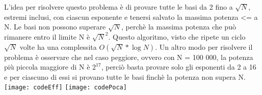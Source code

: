 
\SolRadLog
L'idea per risolvere questo problema è di provare tutte le basi da 2 fino a $\sqrt{N}$, estremi inclusi, con ciascun esponente e tenersi salvato la massima potenza <= a N.
Le basi non possono superare $\sqrt{N}$, perchè la massima potenza che può rimanere entro il limite N è $\sqrt{N}^2$.
\newline
Questo algoritmo, visto che ripete un ciclo $\sqrt{N}$ volte ha una complessita $O(\sqrt{N}*\log{N})$.
\newline
\SolTrucco
Un altro modo per risolvere il problema è osservare che nel caso peggiore, ovvero con N = 100 000, la potenza più piccola maggiore di N è $2^{17}$, perciò basta provare solo gli esponenti da 2 a 16 e per ciascuno di essi si provano tutte le basi finchè la potenza non supera N.
\newline
\CodeRadLog
\texttt{[image: codeEff]}
\CodePoca
\texttt{[image: codePoca]}